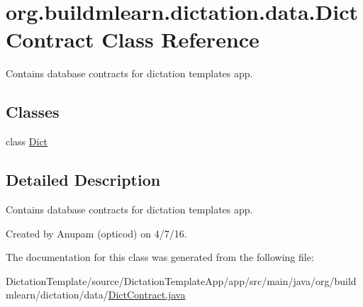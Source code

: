 \hypertarget{classorg_1_1buildmlearn_1_1dictation_1_1data_1_1DictContract}{}\section{org.\+buildmlearn.\+dictation.\+data.\+Dict\+Contract Class Reference}
\label{classorg_1_1buildmlearn_1_1dictation_1_1data_1_1DictContract}


Contains database contracts for dictation template\textquotesingle{}s app.  


\subsection*{Classes}
\begin{DoxyCompactItemize}
\item 
class \hyperlink{classorg_1_1buildmlearn_1_1dictation_1_1data_1_1DictContract_1_1Dict}{Dict}
\end{DoxyCompactItemize}


\subsection{Detailed Description}
Contains database contracts for dictation template\textquotesingle{}s app. 

Created by Anupam (opticod) on 4/7/16. 

The documentation for this class was generated from the following file\+:\begin{DoxyCompactItemize}
\item 
Dictation\+Template/source/\+Dictation\+Template\+App/app/src/main/java/org/buildmlearn/dictation/data/\hyperlink{DictContract_8java}{Dict\+Contract.\+java}\end{DoxyCompactItemize}
